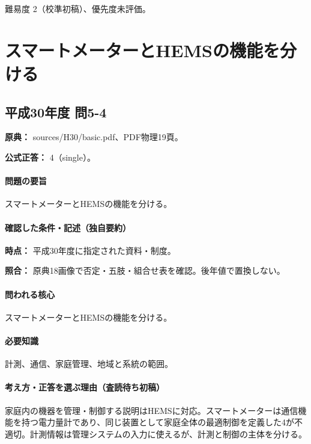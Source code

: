 \par 難易度 2（校準初稿）、優先度未評価。

\section{スマートメーターとHEMSの機能を分ける}

\subsection{平成30年度 問5-4}
\label{q:h30-reg-basic-5-4}

\noindent\textbf{原典：} sources/H30/basic.pdf、PDF物理19頁。

\textbf{公式正答：} 4（single）。

\paragraph{問題の要旨} スマートメーターとHEMSの機能を分ける。

\paragraph{確認した条件・記述（独自要約）}\mbox{}\par

\noindent\textbf{時点：} 平成30年度に指定された資料・制度。\par

\noindent\textbf{照合：} 原典18画像で否定・五肢・組合せ表を確認。後年値で置換しない。\par

\paragraph{問われる核心} スマートメーターとHEMSの機能を分ける。

\paragraph{必要知識} 計測、通信、家庭管理、地域と系統の範囲。

\paragraph{考え方・正答を選ぶ理由（査読待ち初稿）} 家庭内の機器を管理・制御する説明はHEMSに対応。スマートメーターは通信機能を持つ電力量計であり、同じ装置として家庭全体の最適制御を定義した4が不適切。計測情報は管理システムの入力に使えるが、計測と制御の主体を分ける。

